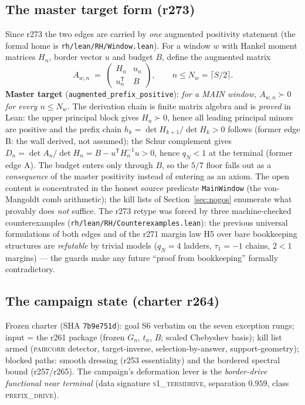 \documentclass[11pt]{article}
\theoremstyle{definition}
\theoremstyle{remark}
\begin{document}
\subsection{The master target form (r273)}\label{sec:master}
Since r273 the two edges are carried by \emph{one} augmented positivity
statement (the formal home is \texttt{rh/lean/RH/Window.lean}).  For a
window $w$ with Hankel moment matrices $H_n$, border vector $u$ and
budget $B$, define the augmented matrix
\[
  A_{w,n} \;=\; \begin{pmatrix} H_n & u_n \\ u_n^{\mathsf T} & B
  \end{pmatrix},
  \qquad n \le N_w = \lceil S/2 \rceil .
\]
\textbf{Master target} (\texttt{augmented\_prefix\_positive}): \emph{for a
MAIN window, $A_{w,n} \succ 0$ for every $n \le N_w$.}  The derivation
chain is finite matrix algebra and is \emph{proved} in Lean: the upper
principal block gives $H_n \succ 0$, hence all leading principal minors
are positive and the prefix chain $h_k = \det H_{k+1}/\det H_k > 0$
follows (former edge B: the wall derived, not assumed); the Schur
complement gives $D_n = \det A_n / \det H_n = B - u^{\mathsf T} H_n^{-1}
u > 0$, hence $q_N < 1$ at the terminal (former edge A).  The budget
enters only through $B$, so the $5/7$ floor falls out as a
\emph{consequence} of the master positivity instead of entering as an
axiom.  The open content is concentrated in the honest source predicate
\texttt{MainWindow} (the von-Mangoldt comb arithmetic); the kill lists of
Section~\ref{sec:nogos} enumerate what provably does \emph{not} suffice.
The r273 retype was forced by three machine-checked counterexamples
(\texttt{rh/lean/RH/Counterexamples.lean}): the previous universal
formulations of both edges and of the r271 margin law H5 over bare
bookkeeping structures are \emph{refutable} by trivial models
($q_N = 4$ ladders, $\tau_1 = -1$ chains, $2 < 1$ margins) --- the guards
make any future ``proof from bookkeeping'' formally contradictory.

\subsection{The campaign state (charter r264)}
Frozen charter (SHA \texttt{7b9e751d}): goal S6 verbatim on the seven
exception rungs; input = the r261 package (frozen $G_n$, $t_n$, $B$;
scaled Chebyshev basis); kill list armed (\textsc{paircorr} detector,
target-inverse, selection-by-answer, support-geometry); blocked paths:
smooth dressing (r253 essentiality) and the bordered spectral bound
(r257/r265).  The campaign's deformation lever is the \emph{border-drive
functional near terminal} (data signature \textsc{s1\_termdrive},
separation $0.959$, class \textsc{prefix\_drive}).
\end{document}
